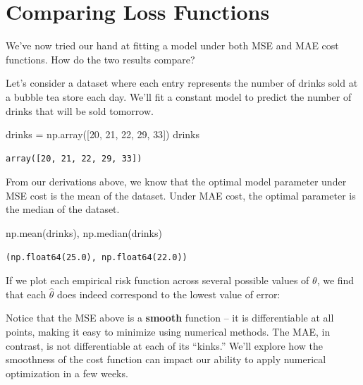 \documentclass[
  letterpaper,
  DIV=11,
  numbers=noendperiod]{scrreprt}
\newenvironment{Shaded}{\begin{snugshade}}{\end{snugshade}}
\newcommand{\DecValTok}[1]{\textcolor[rgb]{0.68,0.00,0.00}{#1}}
\newcommand{\NormalTok}[1]{\textcolor[rgb]{0.00,0.23,0.31}{#1}}
\newcommand{\OperatorTok}[1]{\textcolor[rgb]{0.37,0.37,0.37}{#1}}
\begin{document}
\section{Comparing Loss Functions}\label{comparing-loss-functions}

We've now tried our hand at fitting a model under both MSE and MAE cost
functions. How do the two results compare?

Let's consider a dataset where each entry represents the number of
drinks sold at a bubble tea store each day. We'll fit a constant model
to predict the number of drinks that will be sold tomorrow.

\begin{Shaded}
\begin{Highlighting}[]
\NormalTok{drinks }\OperatorTok{=}\NormalTok{ np.array([}\DecValTok{20}\NormalTok{, }\DecValTok{21}\NormalTok{, }\DecValTok{22}\NormalTok{, }\DecValTok{29}\NormalTok{, }\DecValTok{33}\NormalTok{])}
\NormalTok{drinks}
\end{Highlighting}
\end{Shaded}

\begin{verbatim}
array([20, 21, 22, 29, 33])
\end{verbatim}

From our derivations above, we know that the optimal model parameter
under MSE cost is the mean of the dataset. Under MAE cost, the optimal
parameter is the median of the dataset.

\begin{Shaded}
\begin{Highlighting}[]
\NormalTok{np.mean(drinks), np.median(drinks)}
\end{Highlighting}
\end{Shaded}

\begin{verbatim}
(np.float64(25.0), np.float64(22.0))
\end{verbatim}

If we plot each empirical risk function across several possible values
of \(\theta\), we find that each \(\hat{\theta}\) does indeed correspond
to the lowest value of error:

Notice that the MSE above is a \textbf{smooth} function -- it is
differentiable at all points, making it easy to minimize using numerical
methods. The MAE, in contrast, is not differentiable at each of its
``kinks.'' We'll explore how the smoothness of the cost function can
impact our ability to apply numerical optimization in a few weeks.
\end{document}
